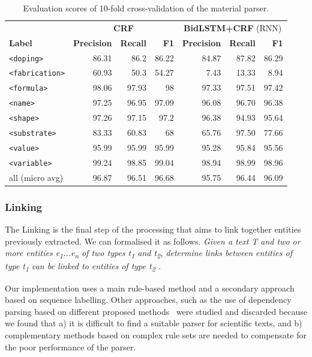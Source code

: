 \documentclass{article}
\begin{document}
\begin{table}[ht]
\centering\small
\begin{tabular}{lrrrrrr}
\toprule
& \multicolumn{3}{c}{\textbf{CRF}} & \multicolumn{3}{c}{\textbf{BidLSTM+CRF} (RNN)}\\
\cmidrule(lr){2-4}\cmidrule(lr){5-7}
\textbf{Label} & \textbf{Precision} & \textbf{Recall} & \textbf{F1} & \textbf{Precision} & \textbf{Recall} & \textbf{F1} \\
\midrule
\texttt{<doping>}      & 86.31   & 86.2     & 86.22 & 84.87 &  87.82 & 86.29   \\
\texttt{<fabrication>} & 60.93   & 50.3     & 54.27 & 7.43  &  13.33 & 8.94   \\
\texttt{<formula>}     & 98.06   & 97.93    & 98    & 97.33 &  97.51 & 97.42  \\
\texttt{<name>}        & 97.25   & 96.95    & 97.09 & 96.08 &  96.70 & 96.38  \\
\texttt{<shape>}       & 97.26   & 97.15    & 97.2  & 96.38 &  94.93 & 95.64  \\
\texttt{<substrate>}   & 83.33   & 60.83    & 68    & 65.76 &  97.50 & 77.66  \\
\texttt{<value>}       & 95.99   & 95.99    & 95.99 & 95.28 &  95.84 & 95.56  \\
\texttt{<variable>}    & 99.24   & 98.85    & 99.04 & 98.94 &  98.99 & 98.96  \\
\midrule
all  (micro avg)       & 96.87   & 96.51    & 96.68  & 95.75 &   96.44  &  96.09  \\
\bottomrule
\end{tabular}
\caption{\label{tab:evaluation-10fold-material-parser} Evaluation scores of 10-fold cross-validation of the material parser. }
\end{table}


\subsubsection{Linking}

The Linking is the final step of the processing that aims to link together entities previously extracted.
We can formalised it as follows. \textit{Given a text T and two or more entities e\textsubscript{1}...e\textsubscript{n} of two types t\textsubscript{1} and t\textsubscript{2}, determine links between entities of type t\textsubscript{1} can be linked to entities of type t\textsubscript{2} .} 

Our implementation uses a main rule-based method and a secondary approach based on sequence labelling. Other approaches, such as the use of dependency parsing based on different proposed methods~\cite{yoshikawa:2017acl, Tiktinsky2020pyBARTES, swayamdipta:17, zhou-zhao-2019-head} were studied and discarded because we found that a) it is difficult to find a suitable parser for scientific texts, and b) complementary methods based on complex rule sets are needed to compensate for the poor performance of the parser.
\end{document}

